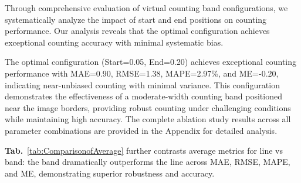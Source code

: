 Through comprehensive evaluation of virtual counting band configurations, we systematically analyze the impact of start and end positions on counting performance. Our analysis reveals that the optimal configuration achieves exceptional counting accuracy with minimal systematic bias.

\begin{table}[h]
    \centering
    \caption{Optimal Virtual Counting Band Configuration (Complete ablation results are provided in Appendix)}
    \label{tab:Optimal_Counting_Band}
\end{table}

The optimal configuration (Start=0.05, End=0.20) achieves exceptional counting performance with MAE=0.90, RMSE=1.38, MAPE=2.97\%, and ME=-0.20, indicating near-unbiased counting with minimal variance. This configuration demonstrates the effectiveness of a moderate-width counting band positioned near the image borders, providing robust counting under challenging conditions while maintaining high accuracy. The complete ablation study results across all parameter combinations are provided in the Appendix for detailed analysis.

\textbf{Tab.}~\ref{tab:ComparisonofAverage} further contrasts average metrics for line vs band: the band dramatically outperforms the line across MAE, RMSE, MAPE, and ME, demonstrating superior robustness and accuracy.

\begin{table}[h]
    \centering
    \caption{Comparison of Average Counting Metrics Lines vs. Zones}
    \label{tab:ComparisonofAverage}
\end{table}



